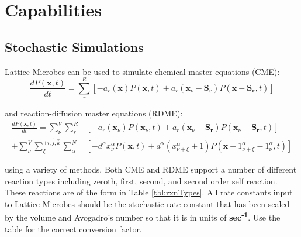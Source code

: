 \chapter{Capabilities}

\section{Stochastic Simulations}
Lattice Microbes can be used to simulate chemical master equations (CME):
\begin{equation*}
\frac{dP(\mathbf{x},t)}{dt}=\sum_{r}^{R} [-a_r({{\mathbf{x}}}) P({{\mathbf{x}}},t) + a_r({{\mathbf{x}}}_\nu-\mathbf{S_r}) P({{\mathbf{x}}}-\mathbf{S_r},t)]
\end{equation*}

\noindent and reaction-diffusion master equations (RDME):
\begin{align*}
\frac{dP(\mathbf{x},t)}{dt}=\sum_{\nu}^{V}\sum_{r}^{R} &[-a_r({{\mathbf{x}}}_\nu) P({{\mathbf{x}}}_\nu,t) + a_r({{\mathbf{x}}}_\nu-\mathbf{S_r}) P({{\mathbf{x}}}_\nu-\mathbf{S_r},t)]\\
+\sum_{\nu}^{V}\sum_{\xi}^{\pm\hat{i},\hat{j},\hat{k}}\sum_{\alpha}^{N} &[-d^{\alpha} x_{\nu}^{\alpha} P({{\mathbf{x}}},t) + d^{\alpha} (x_{\nu+\xi}^{\alpha}+1) P({{\mathbf{x}}}+1_{\nu+\xi}^{\alpha}-1_{\nu}^{\alpha},t)]
\end{align*}

\noindent using a variety of methods.  Both CME and RDME support a number of different reaction types including zeroth, first, second, and second order self reaction.  These reactions are of the form in Table \ref{tbl:rxnTypes}.  All rate constants input to Lattice Microbes should be the stochastic rate constant that has been scaled by the volume and Avogadro's number so that it is in units of \textbf{sec\textsuperscript{-1}}.  Use the table for the correct conversion factor.

